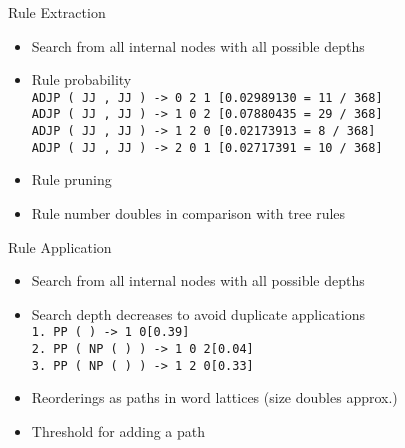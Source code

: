 \documentclass[18pt]{beamer}
\newcommand{\ul}[1]{{\color{red}{#1}}}
\begin{document}
\begin{frame}{Rule Extraction}
\begin{itemize}[<+-| alert@+>]
\item Search from all internal nodes with all possible depths
\item Rule probability
\bigskip \\
\texttt{ADJP ( JJ , JJ ) -> 0 2 1 \hphantom{xx}  [0.02989130 = \hphantom{x}11 / 368]}\\
\texttt{ADJP ( JJ , JJ ) -> 1 0 2 \hphantom{xx}  [0.07880435 =  \hphantom{x}29 / 368]}\\
\texttt{ADJP ( JJ , JJ ) -> 1 2 0 \hphantom{xx}  [0.02173913 =  \hphantom{xx}8 / 368]}\\
\texttt{ADJP ( JJ , JJ ) -> 2 0 1 \hphantom{xx}  [0.02717391 =  \hphantom{x}10 / 368]} \bigskip \\
\item Rule pruning
\item Rule number doubles in comparison with tree rules
\end{itemize}
\end{frame}

\begin{frame}{Rule Application}
\begin{itemize}[<+-| alert@+>]
\item Search from all internal nodes with all possible depths
\item Search depth decreases to avoid duplicate applications \bigskip \\
\texttt{1. PP ( \ul{IN$_0$} \ul{NP$_1$} ) -> 1 0\hspace{10em}[0.39]}\\
\texttt{2. PP ( \ul{IN$_0$} NP ( \ul{JJ$_1$} \ul{NNS$_2$} ) ) -> 1 0 2\hspace{3em}\hspace{1pt}[0.04]} \\
\texttt{3. PP ( \ul{IN$_0$} NP ( \ul{JJ$_1$} \ul{NNS$_2$} ) ) -> 1 2 0\hspace{3em}\hspace{1pt}[0.33]} \bigskip \\
\item Reorderings as paths in word lattices (size doubles approx.)
\item Threshold for adding a path
\end{itemize}
\end{frame}
\end{document}
